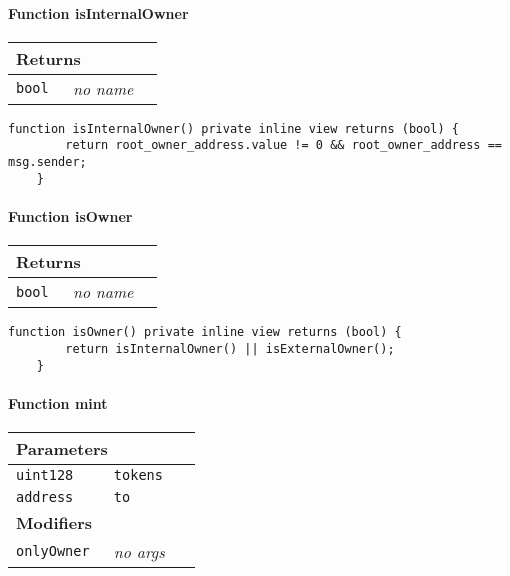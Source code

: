 \paragraph{Function isInternalOwner}


\ifsoltables
\noindent\begin{tabular}{|l|l|p{5cm}|}\hline
\multicolumn{3}{|l|}{\bf Returns}\\\hline
\tt bool & {\em no name} &\\\hline
\end{tabular}
\fi

\vspace{2cm}

\begin{lstlisting}[firstnumber=472]
    function isInternalOwner() private inline view returns (bool) {
        return root_owner_address.value != 0 && root_owner_address == msg.sender;
    }
\end{lstlisting}

\paragraph{Function isOwner}


\ifsoltables
\noindent\begin{tabular}{|l|l|p{5cm}|}\hline
\multicolumn{3}{|l|}{\bf Returns}\\\hline
\tt bool & {\em no name} &\\\hline
\end{tabular}
\fi

\vspace{2cm}

\begin{lstlisting}[firstnumber=468]
    function isOwner() private inline view returns (bool) {
        return isInternalOwner() || isExternalOwner();
    }
\end{lstlisting}

\paragraph{Function mint}


\ifsoltables
\noindent\begin{tabular}{|l|l|p{5cm}|}\hline
\multicolumn{3}{|l|}{\bf Parameters}\\\hline
\tt uint128 & \tt tokens &\\\hline
\tt address & \tt to &\\\hline
\multicolumn{3}{|l|}{\bf Modifiers}\\\hline
\tt onlyOwner & {\em no args} &\\\hline
\end{tabular}
\fi

